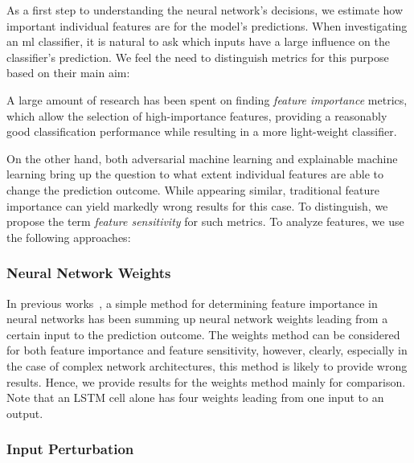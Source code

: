 \documentclass[conference]{IEEEtran}
\begin{document}
As a first step to understanding the neural network's decisions, we  estimate how important individual features are for the model's predictions.
When investigating an \gls{ml} classifier, it is natural to ask which inputs have a large influence on the classifier's prediction. We feel the need to distinguish metrics for this purpose based on their main aim:

A large amount of research has been spent on finding \emph{feature importance} metrics, which allow the selection  of high-importance features, providing a reasonably good classification performance while resulting in a more light-weight classifier.

On the other hand, both adversarial machine learning and explainable machine learning bring up the question to what extent individual features are able to change the prediction outcome. While appearing similar, traditional feature importance can yield markedly wrong results for this case.  To distinguish, we propose the term \emph{feature sensitivity} for such metrics.
To analyze features, we use the following approaches:

\subsubsection{Neural Network Weights}
In previous works~\cite{olden_accurate_2004}, a simple method for determining feature importance in neural networks has been summing up neural network weights leading from a certain input to the prediction outcome. The weights method can be considered for both feature importance and feature sensitivity, however, clearly, especially in the case of complex network architectures, this method is likely to provide wrong results. Hence, we provide results for the weights method mainly for comparison. Note that an LSTM cell alone has four weights leading from one input to an output.

\subsubsection{Input Perturbation}
\end{document}
